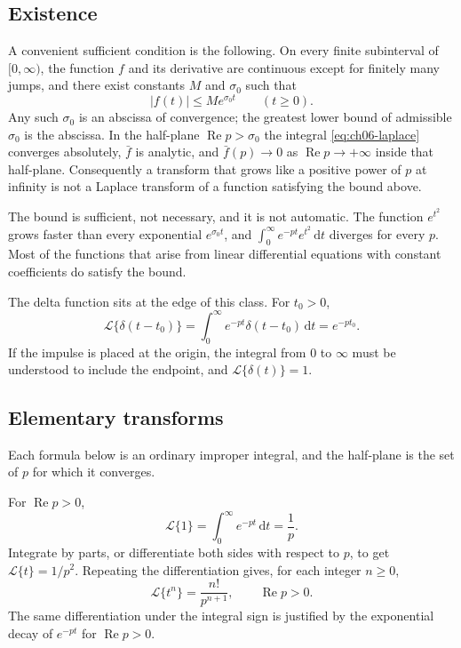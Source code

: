 \subsection{Existence}

A convenient sufficient condition is the following. On every finite subinterval of $[0,\infty)$, the function $f$ and its derivative are continuous except for finitely many jumps, and there exist constants $M$ and $\sigma_0$ such that
\begin{equation}
|f(t)|\leq M e^{\sigma_0 t}
\qquad(t\geq 0).
\end{equation}
Any such $\sigma_0$ is an abscissa of convergence; the greatest lower bound of admissible $\sigma_0$ is the abscissa. In the half-plane $\operatorname{Re}p>\sigma_0$ the integral \eqref{eq:ch06-laplace} converges absolutely, $\bar f$ is analytic, and $\bar f(p)\to 0$ as $\operatorname{Re}p\to+\infty$ inside that half-plane. Consequently a transform that grows like a positive power of $p$ at infinity is not a Laplace transform of a function satisfying the bound above.

The bound is sufficient, not necessary, and it is not automatic. The function $e^{t^2}$ grows faster than every exponential $e^{\sigma_0 t}$, and $\int_0^{\infty}e^{-pt}e^{t^2}\,\mathrm{d}t$ diverges for every $p$. Most of the functions that arise from linear differential equations with constant coefficients do satisfy the bound.

The delta function sits at the edge of this class. For $t_0>0$,
\begin{equation}
\mathcal{L}\{\delta(t-t_0)\}
=\int_0^{\infty}e^{-pt}\delta(t-t_0)\,\mathrm{d}t
=e^{-pt_0}.
\label{eq:ch06-laplace-delta}
\end{equation}
If the impulse is placed at the origin, the integral from $0$ to $\infty$ must be understood to include the endpoint, and $\mathcal{L}\{\delta(t)\}=1$.

\subsection{Elementary transforms}

Each formula below is an ordinary improper integral, and the half-plane is the set of $p$ for which it converges.

\begin{example}[Powers of $t$]
For $\operatorname{Re}p>0$,
\begin{equation}
\mathcal{L}\{1\}=\int_0^{\infty}e^{-pt}\,\mathrm{d}t=\frac{1}{p}.
\end{equation}
Integrate by parts, or differentiate both sides with respect to $p$, to get $\mathcal{L}\{t\}=1/p^2$. Repeating the differentiation gives, for each integer $n\geq 0$,
\begin{equation}
\mathcal{L}\{t^n\}=\frac{n!}{p^{n+1}},
\qquad\operatorname{Re}p>0.
\label{eq:ch06-laplace-tn}
\end{equation}
The same differentiation under the integral sign is justified by the exponential decay of $e^{-pt}$ for $\operatorname{Re}p>0$.
\end{example}

